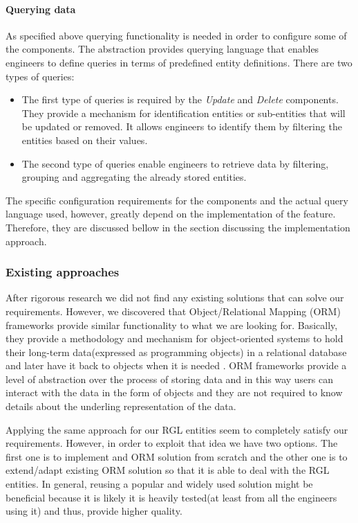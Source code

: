 \paragraph{Querying data}

As specified above querying functionality is needed in order to configure some of the components. The abstraction provides querying language that enables engineers to define queries in terms of predefined entity definitions. There are two types of queries:

\begin{itemize}
	\item The first type of queries is required by the \textit{Update} and \textit{Delete} components. They provide a mechanism for identification entities or sub-entities that will be updated or removed. It allows engineers to identify them by filtering the entities based on their values.
	
	\item The second type of queries enable engineers to retrieve data by filtering, grouping and aggregating the already stored entities.
\end{itemize}

The specific configuration requirements for the components and the actual query language used, however, greatly depend on the implementation of the feature. Therefore, they are discussed bellow in the section discussing the implementation approach.

\subsubsection{Existing approaches}

After rigorous research we did not find any existing solutions that can solve our requirements. However, we discovered that Object/Relational Mapping (ORM) frameworks provide similar functionality to what we are looking for. Basically, they provide a methodology and mechanism for object-oriented systems to hold their long-term data(expressed as programming objects) in a relational database and later have it back to objects when it is needed \cite{o2008object}. ORM frameworks provide a level of abstraction over the process of storing data and in this way users can interact with the data in the form of objects and they are not required to know details about the underling representation of the data. 

Applying the same approach for our RGL entities seem to completely satisfy our requirements. However, in order to exploit that idea we have two options. The first one is to implement and ORM solution from scratch and the other one is to extend/adapt existing ORM solution so that it is able to deal with the RGL entities. In general, reusing a popular and widely used solution might be beneficial because it is likely it is heavily tested(at least from all the engineers using it) and thus, provide higher quality. 

